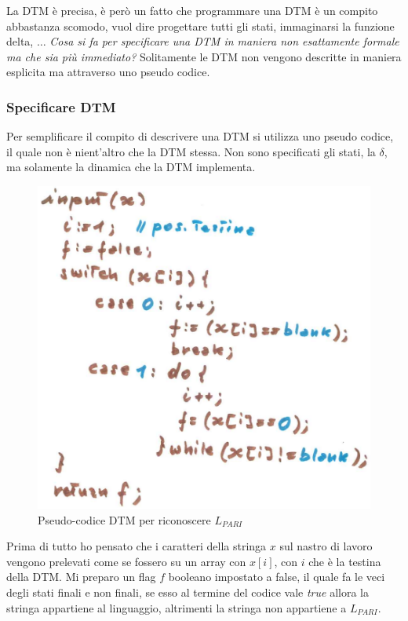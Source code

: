 \documentclass{article}
\begin{document}
La DTM è precisa, è però un fatto che programmare una DTM è un compito abbastanza
scomodo, vuol dire progettare tutti gli stati, immaginarsi la funzione delta, $\dots$
\textit{Cosa si fa per specificare una DTM in maniera non esattamente
formale ma che sia più immediato?} Solitamente le DTM non vengono descritte
in maniera esplicita ma attraverso uno pseudo codice.

\subsubsection{Specificare DTM}
Per semplificare il compito di descrivere una DTM si utilizza uno pseudo codice,
il quale non è nient'altro che la DTM stessa. Non sono specificati gli stati,
la $\delta$, ma solamente la dinamica che la DTM implementa.

\begin{figure}[H]
    \centering
    \includegraphics[scale=0.5]{images/pseudo_DTM.png}
    \caption{Pseudo-codice DTM per riconoscere $L_{PARI}$}
\end{figure}
Prima di tutto ho pensato che i caratteri della stringa $x$ sul
nastro di lavoro vengono prelevati come se fossero su un array con $x[i]$,
con $i$ che è la testina della DTM. Mi preparo un flag $f$ booleano impostato
a false, il quale fa le veci degli stati finali e non finali, se esso
al termine del codice vale \textit{true} allora
la stringa appartiene al linguaggio, altrimenti la stringa non appartiene
a $L_{PARI}$.
\end{document}
